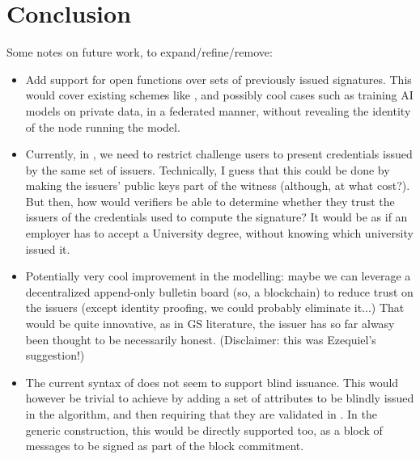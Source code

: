 \section{Conclusion}
\label{sec:conclusion}


Some notes on future work, to expand/refine/remove:

\begin{itemize}
\item Add support for open functions over sets of previously issued signatures.
  This would cover existing schemes like \cite{dl21}, and possibly cool cases
  such as training AI models on private data, in a federated manner, without
  revealing the identity of the node running the model.
\item Currently, in \UAS, we need to restrict challenge users to present
  credentials issued by the same set of issuers. Technically, I guess that this
  could be done by making the issuers' public keys part of the witness (although,
  at what cost?). But then, how would verifiers be able to determine whether
  they trust the issuers of the credentials used to compute the signature? It
  would be as if an employer has to accept a University degree, without knowing
  which university issued it.  
\item Potentially very cool improvement in the modelling: maybe we can leverage
  a decentralized append-only bulletin board (so, a blockchain) to reduce trust
  on the issuers (except identity proofing, we could probably eliminate it...)
  That would be quite innovative, as in GS literature, the issuer has so far
  alwasy been thought to be necessarily honest. (Disclaimer: this was Ezequiel's
  suggestion!)
\item The current syntax of \UAS does not seem to support blind issuance. This
  would however be trivial to achieve by adding a set of attributes to be
  blindly issued in the \Obtain algorithm, and then requiring that they are
  validated in \fissue. In the generic construction, this would be directly
  supported too, as a block of messages to be signed as part of the block
  commitment.
\end{itemize}

